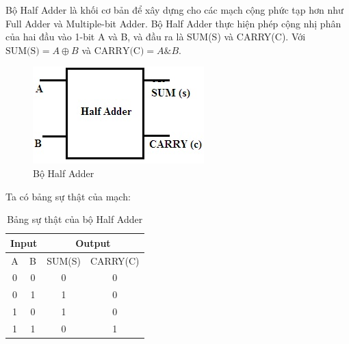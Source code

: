 
Bộ Half Adder là khối cơ bản để xây dựng cho các mạch cộng phức tạp hơn như Full Adder và Multiple-bit Adder. Bộ Half Adder thực hiện phép cộng nhị phân của hai đầu vào 1-bit A và B, và đầu ra là SUM(S) và CARRY(C). Với $\text{SUM(S)} = A \oplus B$ và $\text{CARRY(C)} = A \& B$.
\begin{figure}[H]
	\centering
	\includegraphics[width=0.5\linewidth]{./image/Half-Adder-blockblock.jpg}
	\caption{Bộ Half Adder}
	\label{f_block haft adder}
\end{figure}

Ta có bảng sự thật của mạch:

\begin{table}[H]
	\centering
	\begin{tabular}{|c|c|c|c|}
		\hline
		\multicolumn{2}{|c|}{Input} & \multicolumn{2}{c|}{Output} \\
		\hline
		A & B & SUM(S) & CARRY(C) \\
		\hline
		0 & 0 & 0 & 0 \\
		\hline
		0 & 1 & 1 & 0 \\
		\hline
		1 & 0 & 1 & 0 \\
		\hline
		1 & 1 & 0 & 1 \\
		\hline
	\end{tabular}
	\caption{Bảng sự thật của bộ Half Adder}
	\label{t_true table}
\end{table}

